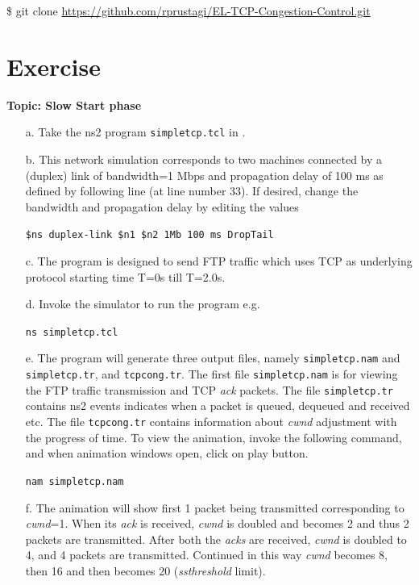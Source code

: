 \begin{multicols}{2}
 \$ git clone \url{https://github.com/rprustagi/EL-TCP-Congestion-Control.git}

\setcounter{section}{0}
\section*{Exercise \label{chap2-exe01}}

\textbf{Topic: Slow Start phase}

\begin{itemize}

\item[a.] Take the ns2 program \texttt{simpletcp.tcl} in \cite{art2-key12}.

\item[b.] This network simulation corresponds to two machines connected by a (duplex) link of bandwidth=1 Mbps and propagation delay of 100 ms as defined by following line (at line number 33). If desired, change the bandwidth and propagation delay by editing the values 

\texttt{\$ns duplex-link \$n1 \$n2 1Mb 100 ms DropTail}

\item[c.] The program is designed to send FTP traffic which uses TCP as underlying protocol starting time T=0s till T=2.0s.

\item[d.] Invoke the simulator to run the program e.g.

\texttt{ns simpletcp.tcl}

\item[e.] The program will generate three output files, namely \texttt{simpletcp.nam} and \texttt{simpletcp.tr}, and \texttt{tcpcong.tr}. The first file \texttt{simpletcp.nam} is for viewing the FTP traffic transmission and TCP \textit{ack} packets. The file \texttt{simpletcp.tr} contains ns2 events indicates when a packet is queued, dequeued and received etc. The file \texttt{tcpcong.tr} contains information about \textit{cwnd} adjustment with the progress of time. To view the animation, invoke the following command, and when animation windows open, click on play button.

\texttt{nam simpletcp.nam}

\item[f.] The animation will show first 1 packet being transmitted corresponding to \textit{cwnd}=1. When its \textit{ack} is received, \textit{cwnd} is doubled and becomes 2 and thus 2 packets are transmitted. After both the \textit{acks} are received, \textit{cwnd} is doubled to 4, and 4 packets are transmitted. Continued in this way \textit{cwnd} becomes 8, then 16 and then becomes 20 (\textit{ssthreshold} limit).


\end{itemize}
\end{multicols}
